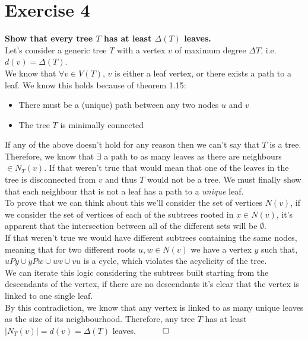 \section*{Exercise 4}
\boldmath
\textbf{Show that every tree $T$ has at least $\Delta(T)$ leaves.}\\
\unboldmath
\linebreak
Let's consider a generic tree $T$ with a vertex $v$ of maximum degree $\Delta T$, i.e. $d(v) = \Delta(T)$. \\
\linebreak 
We know that $\forall v \in V(T)$, $v$ is either a leaf vertex, or there exists a path to a leaf. We know this holds because of theorem 1.15:
\begin{itemize}
       \item There must be a (unique) path between any two nodes $u$ and $v$
       \item The tree $T$ is minimally connected
\end{itemize}
If any of the above doesn't hold for any reason then we can't say that $T$ is a tree. 
\\
\linebreak 
Therefore, we know that $\exists$ a path to as many leaves as there are neighbours $\in N_T(v)$. If that weren't true that would mean that one of the leaves in the tree is disconnected from $v$ and thus $T$ would not be a tree. We must finally show that each neighbour that is not a leaf has a path to a \textit{unique} leaf. \\
\linebreak 
To prove that we can think about this we'll consider the set of vertices $N(v)$, if we consider the
set of vertices of each of the subtrees rooted in $x \in N(v)$, it's apparent that the intersection
between all of the different sets will be $\emptyset$.\\ 
If that weren't true we would have different subtrees containing the same nodes, meaning that for
two different roots $u, w \in N(v)$ we have a vertex $y$ such that, $uPy \cup yPw \cup wv \cup vu$
is a cycle, which violates the acyclicity of the tree.\\ 
\linebreak 
We can iterate this logic considering the subtrees built starting from the descendants of the
vertex, if there are no descendants it's clear that the vertex is linked to one single leaf.\\ 
\linebreak
By this contradiction, we know that any vertex is linked to as many unique leaves as the size of its neighbourhood. Therefore, any tree $T$ has at least $|N_T(v)| = d(v) = \Delta(T)$ leaves. $\hspace{10mm} \square$ 
